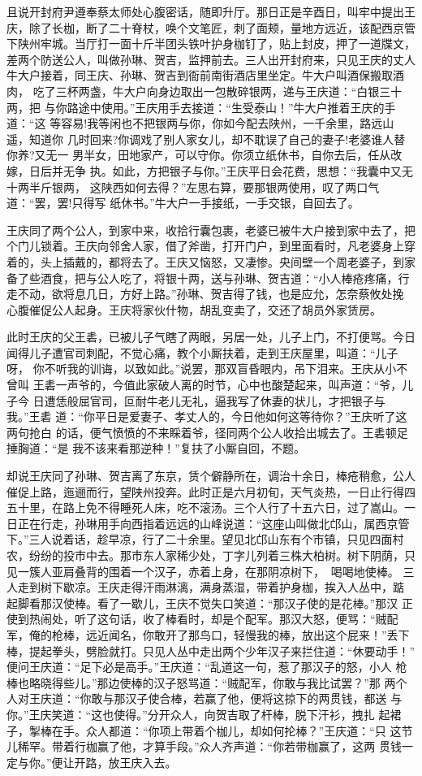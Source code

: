 且说开封府尹遵奉蔡太师处心腹密话，随即升厅。那日正是辛酉日，叫牢中提出王
庆，除了长枷，断了二十脊杖，唤个文笔匠，刺了面颊，量地方远近，该配西京管
下陕州牢城。当厅打一面十斤半团头铁叶护身枷钉了，贴上封皮，押了一道牒文，
差两个防送公人，叫做孙琳、贺吉，监押前去。三人出开封府来，只见王庆的丈人
牛大户接着，同王庆、孙琳、贺吉到衙前南街酒店里坐定。牛大户叫酒保搬取酒肉，
吃了三杯两盏，牛大户向身边取出一包散碎银两，递与王庆道：“白银三十两，把
与你路途中使用。”王庆用手去接道：“生受泰山！”牛大户推着王庆的手道：“这
等容易!我等闲也不把银两与你，你如今配去陕州，一千余里，路远山遥，知道你
几时回来?你调戏了别人家女儿，却不耽误了自己的妻子!老婆谁人替你养?又无一
男半女，田地家产，可以守你。你须立纸休书，自你去后，任从改嫁，日后并无争
执。如此，方把银子与你。”王庆平日会花费，思想：“我囊中又无十两半斤银两，
这陕西如何去得？”左思右算，要那银两使用，叹了两口气道：“罢，罢!只得写
纸休书。”牛大户一手接纸，一手交银，自回去了。

王庆同了两个公人，到家中来，收拾行囊包裹，老婆已被牛大户接到家中去了，把
个门儿锁着。王庆向邻舍人家，借了斧凿，打开门户，到里面看时，凡老婆身上穿
着的，头上插戴的，都将去了。王庆又恼怒，又凄惨。央间壁一个周老婆子，到家
备了些酒食，把与公人吃了，将银十两，送与孙琳、贺吉道：“小人棒疮疼痛，行
走不动，欲将息几日，方好上路。”孙琳、贺吉得了钱，也是应允，怎奈蔡攸处挽
心腹催促公人起身。王庆将家伙什物，胡乱变卖了，交还了胡员外家赁房。

此时王庆的父王砉，已被儿子气瞎了两眼，另居一处，儿子上门，不打便骂。今日
闻得儿子遭官司刺配，不觉心痛，教个小厮扶着，走到王庆屋里，叫道：“儿子呀，
你不听我的训诲，以致如此。”说罢，那双盲昏眼内，吊下泪来。王庆从小不曾叫
王砉一声爷的，今值此家破人离的时节，心中也酸楚起来，叫声道：“爷，儿子今
日遭恁般屈官司，叵耐牛老儿无礼，逼我写了休妻的状儿，才把银子与我。”王砉
道：“你平日是爱妻子、孝丈人的，今日他如何这等待你？”王庆听了这两句抢白
的话，便气愤愤的不来睬着爷，径同两个公人收拾出城去了。王砉顿足捶胸道：“是
我不该来看那逆种！”复扶了小厮自回，不题。

却说王庆同了孙琳、贺吉离了东京，赁个僻静所在，调治十余日，棒疮稍愈，公人
催促上路，迤逦而行，望陕州投奔。此时正是六月初旬，天气炎热，一日止行得四
五十里，在路上免不得睡死人床，吃不滚汤。三个人行了十五六日，过了嵩山。一
日正在行走，孙琳用手向西指着远远的山峰说道：“这座山叫做北邙山，属西京管
下。”三人说着话，趁早凉，行了二十余里。望见北邙山东有个市镇，只见四面村
农，纷纷的投市中去。那市东人家稀少处，丁字儿列着三株大柏树。树下阴荫，只
见一簇人亚肩叠背的围着一个汉子，赤着上身，在那阴凉树下，喝喝地使棒。
三人走到树下歇凉。王庆走得汗雨淋漓，满身蒸湿，带着护身枷，挨入人丛中，踮
起脚看那汉使棒。看了一歇儿，王庆不觉失口笑道：“那汉子使的是花棒。”那汉
正使到热闹处，听了这句话，收了棒看时，却是个配军。那汉大怒，便骂：“贼配
军，俺的枪棒，远近闻名，你敢开了那鸟口，轻慢我的棒，放出这个屁来！”丢下
棒，提起拳头，劈脸就打。只见人丛中走出两个少年汉子来拦住道：“休要动手！”
便问王庆道：“足下必是高手。”王庆道：“乱道这一句，惹了那汉子的怒，小人
枪棒也略晓得些儿。”那边使棒的汉子怒骂道：“贼配军，你敢与我比试罢？”那
两个人对王庆道：“你敢与那汉子使合棒，若赢了他，便将这掠下的两贯钱，都送
与你。”王庆笑道：“这也使得。”分开众人，向贺吉取了杆棒，脱下汗衫，拽扎
起裙子，掣棒在手。众人都道：“你项上带着个枷儿，却如何抡棒？”王庆道：“只
这节儿稀罕。带着行枷赢了他，才算手段。”众人齐声道：“你若带枷赢了，这两
贯钱一定与你。”便让开路，放王庆入去。

